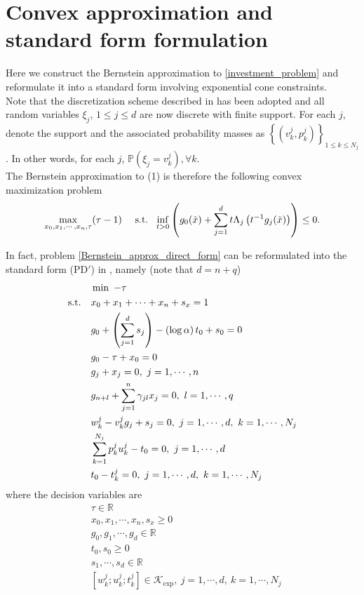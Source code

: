 \documentclass[11pt]{article}
\begin{document}
\section*{Convex approximation and standard form formulation }
Here we construct the Bernstein approximation to \eqref{investment_problem} and reformulate it into a standard form involving exponential cone constraints. \\

Note that the discretization scheme described in \cite{Nemirovsky_and_Shapiro} has been adopted and all random variables $\xi_j$, $1\leq j \leq d$ are now discrete with finite support. For each $j$, denote the support and the associated probability masses as $\left\{(v_k^j, p_k^j)\right\}_{1\leq k \leq N_j}$. In other words, for each $j$, $\mathbb{P}\left(\xi_j = v_k^j\right), \forall k$. \\

The Bernstein approximation to (1) is therefore the following convex maximization problem
\begin{align} \label{Bernstein_approx_direct_form}
\max_{x_0, x_1, \cdots, x_n, \tau} (\tau - 1)\ \ \ \ \textnormal{s.t.}\ \ \inf_{t>0} \left(g_0(\tilde{x}) + \sum_{j=1}^d t \Lambda_j\left(t^{-1}g_j(\tilde{x})\right) \right) \leq 0.
\end{align}

In fact, problem \eqref{Bernstein_approx_direct_form} can be reformulated into the standard form (PD$'$) in \cite{Gao_Yuan_thesis}, namely (note that $d = n+q$)
\begin{align*}
&\min \ -\tau \\ 
\textnormal{s.t.}\ \ \ & x_0 + x_1 + \cdots + x_n + s_x = 1 \\
& g_0 + \left(\sum_{j=1}^d s_j\right) - \left(\log \alpha\right) t_0 + s_0 = 0 \\
& g_0  - \tau + x_0 = 0 \\
& g_j + x_j = 0,\ j = 1, \cdots, n \\
& g_{n+l} + \sum_{j=1}^n \gamma_{jl} x_j = 0,\ l = 1, \cdots, q \\
& w_k^j - v_k^j g_j + s_j = 0,\ j = 1, \cdots,d,\ k = 1, \cdots, N_j \\
& \sum_{k=1}^{N_j} p_k^j u_k^j - t_0 = 0,\  j =1,\cdots,d \\
& t_0 - t_k^j = 0,\ j = 1,\cdots, d,\ k = 1,\cdots,N_j
\end{align*}
where the decision variables are
\begin{align*}
& \tau \in \mathbb{R} \\
& x_0, x_1, \cdots, x_n, s_x \geq 0 \\
& g_0, g_1, \cdots, g_d \in \mathbb{R} \\
& t_0, s_0 \geq 0 \\
& s_1, \cdots, s_d \in \mathbb{R} \\
& [w_k^j; u_k^j; t_k^j] \in \mathcal{K}_{\exp},\ j = 1, \cdots, d,\ k = 1,\cdots, N_j
\end{align*}


{}

\end{document}
